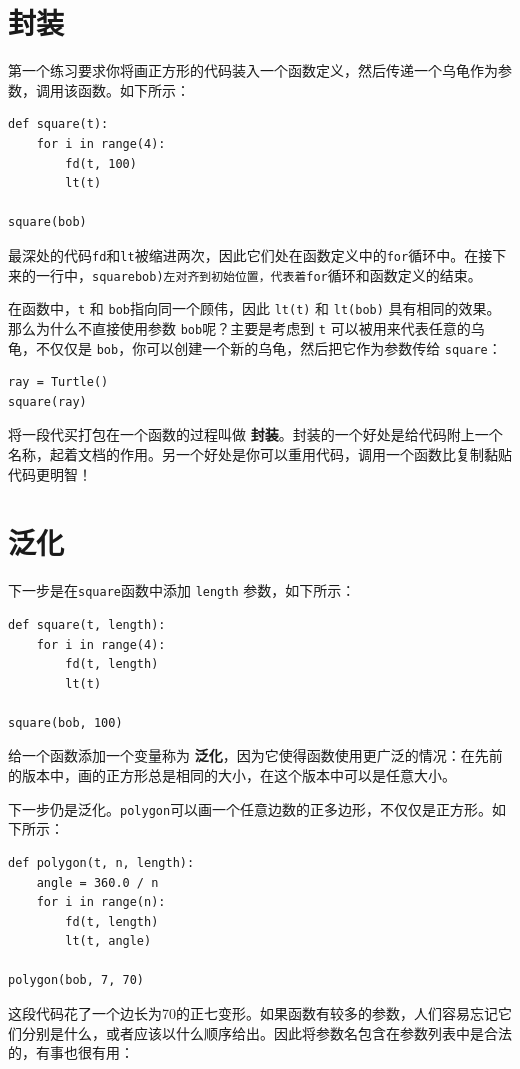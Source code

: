 \section{封装}

第一个练习要求你将画正方形的代码装入一个函数定义，然后传递一个乌龟作为参数，调用该函数。如下所示：

\beforeverb
\begin{verbatim}
def square(t):
    for i in range(4):
        fd(t, 100)
        lt(t)

square(bob)
\end{verbatim}
\afterverb
%
最深处的代码{\tt fd}和{\tt lt}被缩进两次，因此它们处在函数定义中的{\tt for}循环中。在接下来的一行中，{\tt square{bob)}左对齐到初始位置，代表着{\tt for}}循环和函数定义的结束。

在函数中，{\tt t} 和 {\tt bob}指向同一个顾伟，因此 {\tt lt(t)} 和 {\tt lt(bob)} 具有相同的效果。那么为什么不直接使用参数 {\tt bob}呢？主要是考虑到 {\tt t} 可以被用来代表任意的乌龟，不仅仅是 {\tt bob}，你可以创建一个新的乌龟，然后把它作为参数传给 {\tt square}：

\beforeverb
\begin{verbatim}
ray = Turtle()
square(ray)
\end{verbatim}
\afterverb
%
将一段代买打包在一个函数的过程叫做 {\bf 封装}。封装的一个好处是给代码附上一个名称，起着文档的作用。另一个好处是你可以重用代码，调用一个函数比复制黏贴代码更明智！



\section{泛化}

下一步是在{\tt square}函数中添加 {\tt length} 参数，如下所示：

\beforeverb
\begin{verbatim}
def square(t, length):
    for i in range(4):
        fd(t, length)
        lt(t)

square(bob, 100)
\end{verbatim}
\afterverb
%
给一个函数添加一个变量称为 {\bf 泛化}，因为它使得函数使用更广泛的情况：在先前的版本中，画的正方形总是相同的大小，在这个版本中可以是任意大小。


下一步仍是泛化。{\tt polygon}可以画一个任意边数的正多边形，不仅仅是正方形。如下所示：

\beforeverb
\begin{verbatim}
def polygon(t, n, length):
    angle = 360.0 / n
    for i in range(n):
        fd(t, length)
        lt(t, angle)

polygon(bob, 7, 70)
\end{verbatim}
\afterverb
%
这段代码花了一个边长为70的正七变形。如果函数有较多的参数，人们容易忘记它们分别是什么，或者应该以什么顺序给出。因此将参数名包含在参数列表中是合法的，有事也很有用：

